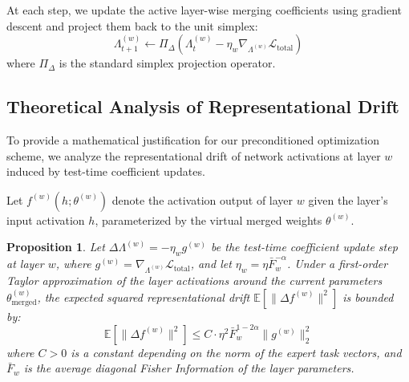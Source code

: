 \documentclass{article}
\theoremstyle{plain}
\newtheorem{proposition}[theorem]{Proposition}
\theoremstyle{definition}
\theoremstyle{remark}
\begin{document}
At each step, we update the active layer-wise merging coefficients using gradient descent and project them back to the unit simplex:
\begin{equation}
  \Lambda^{(w)}_{t+1} \leftarrow \Pi_{\Delta} \left( \Lambda^{(w)}_t - \eta_w \nabla_{\Lambda^{(w)}} \mathcal{L}_{\text{total}} \right)
\end{equation}
where $\Pi_{\Delta}$ is the standard simplex projection operator.

\subsection{Theoretical Analysis of Representational Drift}
To provide a mathematical justification for our preconditioned optimization scheme, we analyze the representational drift of network activations at layer $w$ induced by test-time coefficient updates.

Let $f^{(w)}(h; \theta^{(w)})$ denote the activation output of layer $w$ given the layer's input activation $h$, parameterized by the virtual merged weights $\theta^{(w)}$. 

\begin{proposition}
\label{prop:drift}
Let $\Delta \Lambda^{(w)} = -\eta_w g^{(w)}$ be the test-time coefficient update step at layer $w$, where $g^{(w)} = \nabla_{\Lambda^{(w)}} \mathcal{L}_{\text{total}}$, and let $\eta_w = \eta \bar{F}_w^{-\alpha}$. Under a first-order Taylor approximation of the layer activations around the current parameters $\theta_{\text{merged}}^{(w)}$, the expected squared representational drift $\mathbb{E}[\|\Delta f^{(w)}\|^2]$ is bounded by:
\begin{equation}
  \mathbb{E}[\|\Delta f^{(w)}\|^2] \leq C \cdot \eta^2 \bar{F}_w^{1 - 2\alpha} \|g^{(w)}\|^2_2
\end{equation}
where $C > 0$ is a constant depending on the norm of the expert task vectors, and $\bar{F}_w$ is the average diagonal Fisher Information of the layer parameters.
\end{proposition}
\end{document}
